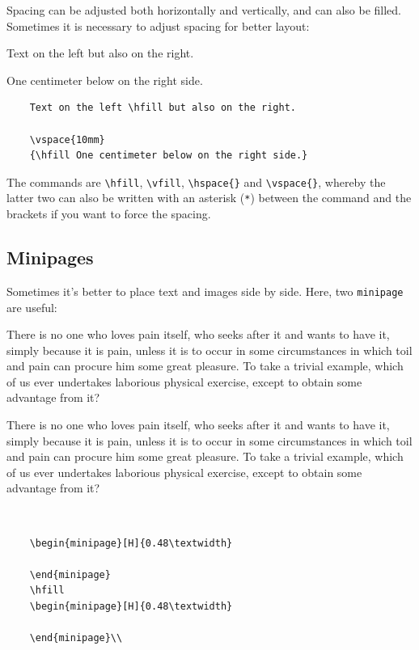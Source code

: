 Spacing can be adjusted both horizontally and vertically, and can also be filled. Sometimes it is necessary to adjust spacing for better layout:

Text on the left \hfill but also on the right.

\vspace{10mm}
{\hfill One centimeter below on the right side.}

\begin{verbatim}
    Text on the left \hfill but also on the right.

    \vspace{10mm}
    {\hfill One centimeter below on the right side.}
\end{verbatim}

The commands are \verb|\hfill|, \verb|\vfill|, \verb|\hspace{}| and \verb|\vspace{}|, whereby the latter two can also be written with an asterisk (\verb|*|) between the command and the brackets if you want to force the spacing.

\pagebreak
\subsection{Minipages}

Sometimes it's better to place text and images side by side. Here, two \verb|minipage| are useful:\\

\begin{minipage}[H]{0.48\textwidth}
	There is no one who loves pain itself, who seeks after it and wants to have it, simply because it is pain, unless it is to occur in some circumstances in which toil and pain can procure him some great pleasure. To take a trivial example, which of us ever undertakes laborious physical exercise, except to obtain some advantage from it?
\end{minipage}
\hfill
\begin{minipage}[H]{0.48\textwidth}
	There is no one who loves pain itself, who seeks after it and wants to have it, simply because it is pain, unless it is to occur in some circumstances in which toil and pain can procure him some great pleasure. To take a trivial example, which of us ever undertakes laborious physical exercise, except to obtain some advantage from it?
\end{minipage}\\

\begin{verbatim}
    \begin{minipage}[H]{0.48\textwidth}
    	
    \end{minipage}
    \hfill
    \begin{minipage}[H]{0.48\textwidth}
    	
    \end{minipage}\\
\end{verbatim}

